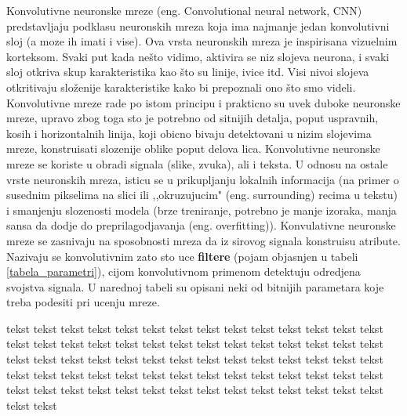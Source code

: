 \documentclass[a4paper]{article}
\begin{document}

Konvolutivne neuronske mreze (eng. Convolutional neural network, CNN) predstavljaju podklasu neuronskih mreza koja ima najmanje jedan konvolutivni sloj (a moze ih imati i vise). Ova vrsta neuronskih mreza je inspirisana vizuelnim korteksom. Svaki put kada nešto vidimo, aktivira se niz slojeva neurona, i svaki sloj otkriva skup karakteristika kao što su linije, ivice itd. Visi nivoi slojeva otkritivaju složenije karakteristike kako bi prepoznali ono što smo videli. Konvolutivne mreze rade po istom principu i prakticno su uvek duboke neuronske mreze, upravo zbog toga sto je potrebno od sitnijih detalja, poput uspravnih, kosih i horizontalnih linija, koji obicno bivaju detektovani u nizim slojevima mreze, konstruisati slozenije oblike poput delova lica. Konvolutivne neuronske mreze se koriste u obradi signala (slike, zvuka), ali i teksta. U odnosu na ostale vrste neuronskih mreza, isticu se u prikupljanju lokalnih informacija (na primer o susednim pikselima na slici ili ,,okruzujucim" (eng. surrounding) recima u tekstu) i smanjenju slozenosti modela (brze treniranje, potrebno je manje izoraka, manja sansa da dodje do preprilagodjavanja (eng. overfitting)). Konvulativne neuronske mreze se zasnivaju na sposobnosti mreza da iz sirovog signala konstruisu atribute. Nazivaju se konvolutivnim zato sto uce \textbf{filtere} (pojam objasnjen u tabeli \ref{tabela_parametri}), cijom konvolutivnom primenom detektuju odredjena svojstva signala. U narednoj tabeli su opisani neki od bitnijih parametara koje treba podesiti pri ucenju mreze.

tekst tekst tekst tekst tekst tekst \newline
tekst tekst tekst tekst tekst tekst \newline
tekst tekst tekst tekst tekst tekst \newline
tekst tekst tekst tekst tekst tekst \newline
tekst tekst tekst tekst tekst tekst \newline
tekst tekst tekst tekst tekst tekst \newline
tekst tekst tekst tekst tekst tekst \newline
tekst tekst tekst tekst tekst tekst \newline
tekst tekst tekst tekst tekst tekst \newline
tekst tekst tekst tekst tekst tekst \newline
tekst tekst tekst tekst tekst tekst \newline
tekst tekst tekst tekst tekst tekst \newline
\end{document}
